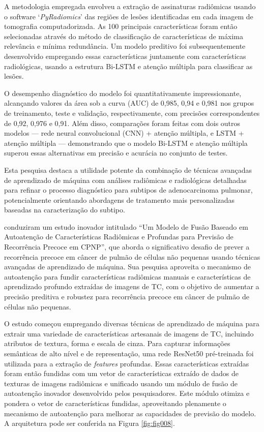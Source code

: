 A metodologia empregada envolveu a extração de assinaturas radiômicas usando o software `\textit{PyRadiomics}' das regiões de lesões identificadas em cada imagem de tomografia computadorizada. As 100 principais características foram então selecionadas através do método de classificação de características de máxima relevância e mínima redundância. Um modelo preditivo foi subsequentemente desenvolvido empregando essas características juntamente com características radiológicas, usando a estrutura Bi-LSTM e atenção múltipla para classificar as lesões.

O desempenho diagnóstico do modelo foi quantitativamente impressionante, alcançando valores da área sob a curva (AUC) de 0,985, 0,94 e 0,981 nos grupos de treinamento, teste e validação, respectivamente, com precisões correspondentes de 0,92, 0,976 e 0,91. Além disso, comparações foram feitas com dois outros modelos — rede neural convolucional (CNN) + atenção múltipla, e LSTM + atenção múltipla — demonstrando que o modelo Bi-LSTM e atenção múltipla superou essas alternativas em precisão e acurácia no conjunto de testes.

Esta pesquisa destaca a utilidade potente da combinação de técnicas avançadas de aprendizado de máquina com análises radiômicas e radiológicas detalhadas para refinar o processo diagnóstico para subtipos de adenocarcinoma pulmonar, potencialmente orientando abordagens de tratamento mais personalizadas baseadas na caracterização do subtipo.

 \cite{aiSelfAttentionBasedFusion2023} conduziram um estudo inovador intitulado ``Um Modelo de Fusão Baseado em Autoatenção de Características Radiômicas e Profundas para Previsão de Recorrência Precoce em CPNP'', que aborda o significativo desafio de prever a recorrência precoce em câncer de pulmão de células não pequenas usando técnicas avançadas de aprendizado de máquina. Sua pesquisa aproveita o mecanismo de autoatenção para fundir características radiômicas manuais e características de aprendizado profundo extraídas de imagens de TC, com o objetivo de aumentar a precisão preditiva e robustez para recorrência precoce em câncer de pulmão de células não pequenas.

O estudo começou empregando diversas técnicas de aprendizado de máquina para extrair uma variedade de características artesanais de imagens de TC, incluindo atributos de textura, forma e escala de cinza. Para capturar informações semânticas de alto nível e de representação, uma rede ResNet50 pré-treinada foi utilizada para a extração de \textit{features} profundas. Essas características extraídas foram então fundidas com um vetor de características extraído de dados de texturas de imagens radiômicas e unificado usando um módulo de fusão de autoatenção inovador desenvolvido pelos pesquisadores. Este módulo otimiza e pondera o vetor de características fundidas, aproveitando plenamente o mecanismo de autoatenção para melhorar as capacidades de previsão do modelo. A arquitetura pode ser conferida na Figura \ref{fig:fig008}.

